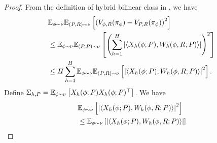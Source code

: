 \begin{proof}
From the definition of hybrid bilinear class in , we have
\begin{align*}
     &\mathbb{E}_{\phi \sim \nu}\mathbb{E}_{(P,R) \sim \nu}\left[\left(V_{\phi, R}(\pi_{\phi}) - V_{P,R}(\pi_{\phi}) \right)^2\right] 
     \\&\le \mathbb{E}_{\phi \sim \nu}\mathbb{E}_{(P,R) \sim \nu}\left[\left(\sum_{h=1}^H \left|\langle X_h(\phi; P), W_h(\phi, R; P)\rangle\right| \right)^2\right] 
     \\&\le H\sum_{h=1}^H \mathbb{E}_{\phi \sim \nu}\mathbb{E}_{(P,R) \sim \nu}\left[\left|\langle X_h(\phi; P), W_h(\phi, R; P)\rangle\right|^2\right]. 
\end{align*}
Define $\Sigma_{h,P} = \mathbb{E}_{\phi \sim \nu}\left[X_h(\phi; P)X_h(\phi; P)^\top\right]$. We have
\begin{align*}
    &\E_{\phi \sim \nu} \left[
\left|\langle X_h(\phi; P), W_h(\phi, R; P)\rangle\right|^2
\right] 
\\& \le \E_{\phi \sim \nu} \left[
\left|\langle X_h(\phi; P), W_h(\phi, R; P)\rangle\right|
\right]

\end{align*}
\end{proof}
